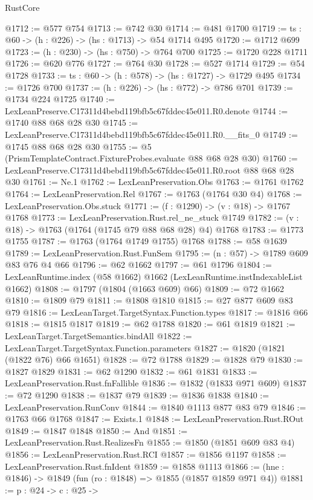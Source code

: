 \begin{lexlean}{RustCore}
\begin{coremodule}
@1712 := @577 @754
@1713 := @742 @30
@1714 := @481 @1700
@1719 := {ts : @60} -> (h : @226) -> (hs : @1713) -> @54 @1714 @495
@1720 := @1712 @699
@1723 := (h : @230) -> (hs : @750) -> @764 @700
@1725 := @1720 @228 @1711
@1726 := @620 @776
@1727 := @764 @30
@1728 := @527 @1714
@1729 := @54 @1728
@1733 := {ts : @60} -> (h : @578) -> (hs : @1727) -> @1729 @495
@1734 := @1726 @700
@1737 := (h : @226) -> (hs : @772) -> @786 @701
@1739 := @1734 @224 @1725
@1740 := LexLeanPreserve.C17311d4bebd119bfb5c67fddec45e011.R0.denote
@1744 := @1740 @88 @68 @28 @30
@1745 := LexLeanPreserve.C17311d4bebd119bfb5c67fddec45e011.R0.__fits_0
@1749 := @1745 @88 @68 @28 @30
@1755 := @5 (PrismTemplateContract.FixtureProbes.evaluate @88 @68 @28 @30)
@1760 := LexLeanPreserve.C17311d4bebd119bfb5c67fddec45e011.R0.root @88 @68 @28 @30
@1761 := Ne.{1}
@1762 := LexLeanPreservation.Obs
@1763 := @1761 @1762
@1764 := LexLeanPreservation.Rel
@1767 := @1763 (@1764 @30 @4)
@1768 := LexLeanPreservation.Obs.stuck
@1771 := (f : @1290) -> (v : @18) -> @1767 @1768
@1773 := LexLeanPreservation.Rust.rel_ne_stuck @1749
@1782 := (v : @18) -> @1763 (@1764 (@1745 @79 @88 @68 @28) @4) @1768
@1783 := @1773 @1755
@1787 := @1763 (@1764 @1749 @1755) @1768
@1788 := @58 @1639
@1789 := LexLeanPreservation.Rust.FunSem
@1795 := (n : @57) -> @1789 @609 @83 @76 @4 @66
@1796 := @62 @1662
@1797 := @61 @1796
@1804 := LexLeanRuntime.index (@58 @1662) @1662 (LexLeanRuntime.instIndexableList @1662)
@1808 := @1797 (@1804 (@1663 @609) @66)
@1809 := @72 @1662
@1810 := @1809 @79
@1811 := @1808 @1810
@1815 := @27 @877 @609 @83 @79
@1816 := LexLeanTarget.TargetSyntax.Function.types
@1817 := @1816 @66
@1818 := @1815 @1817
@1819 := @62 @1788
@1820 := @61 @1819
@1821 := LexLeanTarget.TargetSemantics.bindAll
@1822 := LexLeanTarget.TargetSyntax.Function.parameters
@1827 := @1820 (@1821 (@1822 @76) @66 @1651)
@1828 := @72 @1788
@1829 := @1828 @79
@1830 := @1827 @1829
@1831 := @62 @1290
@1832 := @61 @1831
@1833 := LexLeanPreservation.Rust.fnFallible
@1836 := @1832 (@1833 @971 @609)
@1837 := @72 @1290
@1838 := @1837 @79
@1839 := @1836 @1838
@1840 := LexLeanPreservation.RunConv
@1844 := @1840 @1113 @877 @83 @79
@1846 := @1763 @66 @1768
@1847 := Exists.{1}
@1848 := LexLeanPreservation.Rust.ROut
@1849 := @1847 @1848
@1850 := And
@1851 := LexLeanPreservation.Rust.RealizesFn
@1855 := @1850 (@1851 @609 @83 @4)
@1856 := LexLeanPreservation.Rust.RCI
@1857 := @1856 @1197
@1858 := LexLeanPreservation.Rust.fnIdent
@1859 := @1858 @1113
@1866 := (hne : @1846) -> @1849 (fun (ro : @1848) => @1855 (@1857 @1859 @971 @4))
@1881 := {p : @24} ->
  {c : @25} ->

\end{coremodule}
\end{lexlean}
